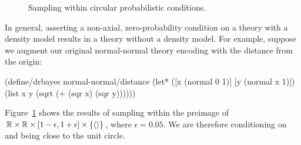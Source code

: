 \begin{figure}[tb!]\centering%
\tab\tab\tab
{}
\caption[Circular probabilistic conditions]{Sampling within circular probabilistic conditions.}%
\label{fig:circular-condition-results}
\end{figure}

In general, asserting a non-axial, zero-probability condition on a theory with a density model results in a theory without a density model.
For example, suppose we augment our original normal-normal theory encoding with the distance from the origin:
\begin{center}\singlespacing
\begin{schemedisplay}
(define/drbayes normal-normal/distance
  (let* ([x  (normal 0 1)]
         [y  (normal x 1)])
    (list x y (sqrt (+ (sqr x) (sqr y))))))
\end{schemedisplay}
\end{center}
Figure~\ref{fig:circular-condition-results} shows the results of sampling within the preimage of $\mathbb{R} \times \mathbb{R} \times [1-\epsilon,1+\epsilon] \times \{{\langle{}\rangle}\}$, where $\epsilon = 0.05$.
We are therefore conditioning on  and  being close to the unit circle.

